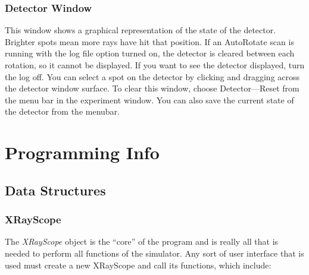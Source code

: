 \documentclass{article}
\begin{document}
\subsubsection{Detector Window}
This window shows a graphical representation of the state of the
detector.  Brighter spots mean more rays have hit that position. If an
AutoRotate scan is running with the log file option turned on, the
detector is cleared between each rotation, so it cannot be displayed.
If you want to see the detector displayed, turn the log off.  You can
select a spot on the detector by clicking and dragging across the
detector window surface.  To clear this window, choose
Detector---Reset from the menu bar in the experiment window.  You can
also save the current state of the detector from the menubar.



\section{Programming Info}

\subsection{Data Structures}

\subsubsection{XRayScope}

The {\em XRayScope} object is the ``core'' of the program and is
really all that is needed to perform all functions of the simulator.
Any sort of user interface that is used must create a new XRayScope
and call its functions, which include:
\end{document}
